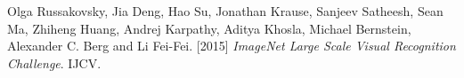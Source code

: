 \begin{thebibliography}{99}

	\bigskip
	
	Olga Russakovsky, Jia Deng, Hao Su, Jonathan Krause, Sanjeev Satheesh, 
	Sean Ma, Zhiheng Huang, Andrej Karpathy, Aditya Khosla, Michael Bernstein, 
	Alexander C. Berg and Li Fei-Fei. [2015] \textit{ImageNet Large Scale
	 Visual Recognition Challenge}. IJCV.
	 
	 
	
\end{thebibliography}
